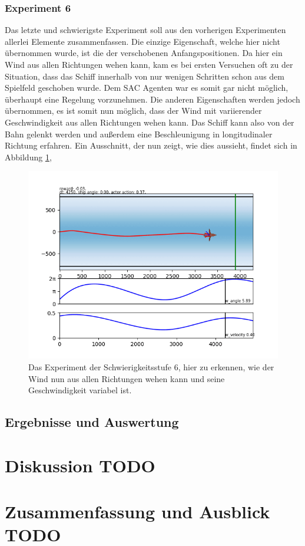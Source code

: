 \documentclass[]{iat}
\begin{document}
\subsection*{Experiment 6}
Das letzte und schwierigste Experiment soll aus den vorherigen Experimenten allerlei Elemente zusammenfassen. Die einzige Eigenschaft, welche hier nicht übernommen wurde, ist die der verschobenen Anfangspositionen. Da hier ein Wind aus allen Richtungen wehen kann, kam es bei ersten Versuchen oft zu der Situation, dass das Schiff innerhalb von nur wenigen Schritten schon aus dem Spielfeld geschoben wurde. Dem SAC Agenten war es somit gar nicht möglich, überhaupt eine Regelung vorzunehmen. Die anderen Eigenschaften werden jedoch übernommen, es ist somit nun möglich, dass der Wind mit variierender Geschwindigkeit aus allen Richtungen wehen kann. Das Schiff kann also von der Bahn gelenkt werden und außerdem eine Beschleunigung in longitudinaler Richtung erfahren. Ein Ausschnitt, der nun zeigt, wie dies aussieht, findet sich in Abbildung \ref{abb:setting6},
\begin{figure}[H]
    \includegraphics[width=\textwidth]{graphics/settings/s6.png}
    \centering
    \caption{Das Experiment der Schwierigkeitsstufe 6, hier zu erkennen, wie der Wind nun aus allen Richtungen wehen kann und seine Geschwindigkeit variabel ist.}
    \label{abb:setting6}
\end{figure}

\section{Ergebnisse und Auswertung}

\chapter{Diskussion TODO} \label{sec:diskussion}

\chapter{Zusammenfassung und Ausblick TODO} \label{sec:zsmfassung_ausblick}


\printbibliography
\end{document}
